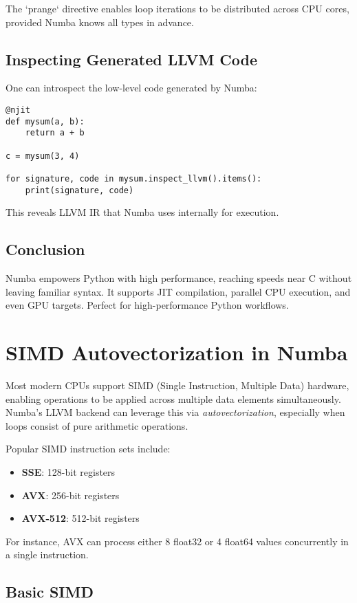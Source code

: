 \documentclass{book}
\begin{document}
The `prange` directive enables loop iterations to be distributed across CPU cores, provided Numba knows all types in advance.

\section{Inspecting Generated LLVM Code}
One can introspect the low-level code generated by Numba:

\begin{lstlisting}
@njit
def mysum(a, b):
    return a + b

c = mysum(3, 4)

for signature, code in mysum.inspect_llvm().items():
    print(signature, code)
\end{lstlisting}

This reveals LLVM IR that Numba uses internally for execution.

\section*{Conclusion}
Numba empowers Python with high performance, reaching speeds near C without leaving familiar syntax. It supports JIT compilation, parallel CPU execution, and even GPU targets. Perfect for high-performance Python workflows.

\pagebreak

\chapter{SIMD Autovectorization in Numba}

Most modern CPUs support SIMD (Single Instruction, Multiple Data) hardware, enabling operations to be applied across multiple data elements simultaneously. Numba’s LLVM backend can leverage this via \emph{autovectorization}, especially when loops consist of pure arithmetic operations.

Popular SIMD instruction sets include:
\begin{itemize}
  \item \textbf{SSE}: 128-bit registers
  \item \textbf{AVX}: 256-bit registers
  \item \textbf{AVX-512}: 512-bit registers
\end{itemize}
For instance, AVX can process either 8 float32 or 4 float64 values concurrently in a single instruction.

\section{Basic SIMD}
\end{document}
